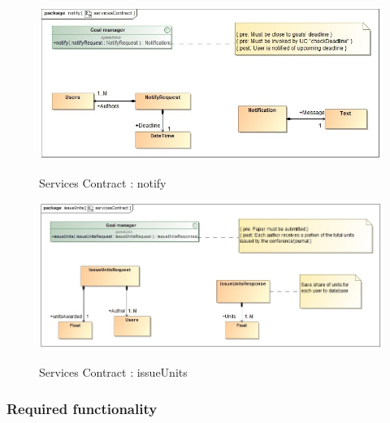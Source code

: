 \documentclass{article}
\begin{document}
		\begin{figure}[H]
			\includegraphics[width=\textwidth]{Ruan_Diagrams/notify_servicesContract.jpg}  \\
			\caption{Services Contract : notify}
		\end{figure}
		\begin{figure}[H]
			\includegraphics[width=\textwidth]{Ruan_Diagrams/issueUnits_servicesContract.jpg}  \\
			\caption{Services Contract : issueUnits}
		\end{figure}

	\subsubsection{Required functionality}
	
\end{document}
